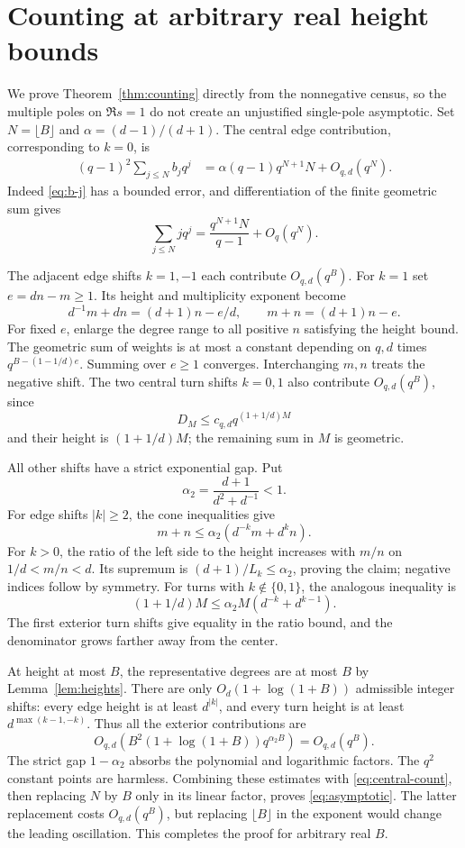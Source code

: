 \section{Counting at arbitrary real height bounds}\label{sec:counting}
We prove Theorem~\ref{thm:counting} directly from the nonnegative
census, so the multiple poles on $\Re s=1$ do not create an
unjustified single-pole asymptotic. Set
$N=\lfloor B\rfloor$ and $\alpha=(d-1)/(d+1)$.
The central edge contribution, corresponding to $k=0$, is
\begin{align}\label{eq:central-count}
 (q-1)^2\sum_{j\le N}b_jq^j
 &=\alpha(q-1)q^{N+1}N+O_{q,d}(q^N).
\end{align}
Indeed \eqref{eq:b-j} has a bounded error, and differentiation
of the finite geometric sum gives
\[
 \sum_{j\le N}j q^j=
 \frac{q^{N+1}N}{q-1}+O_q(q^N).
\]

The adjacent edge shifts $k=1,-1$ each contribute
$O_{q,d}(q^B)$. For $k=1$ set $e=dn-m\ge1$.
Its height and multiplicity exponent become
\[
 d^{-1}m+dn=(d+1)n-e/d,\qquad m+n=(d+1)n-e.
\]
For fixed $e$, enlarge the degree range to all positive $n$
satisfying the height bound. The geometric sum of weights is
at most a constant depending on $q,d$ times
$q^{B-(1-1/d)e}$. Summing over $e\ge1$ converges.
Interchanging $m,n$ treats the negative shift. The two central
turn shifts $k=0,1$ also contribute $O_{q,d}(q^B)$, since
\[
 D_M\le c_{q,d}q^{(1+1/d)M}
\]
and their height is $(1+1/d)M$; the remaining sum in $M$
is geometric.

All other shifts have a strict exponential gap. Put
\begin{equation}\label{eq:alpha-two}
 \alpha_2=\frac{d+1}{d^2+d^{-1}}<1.
\end{equation}
For edge shifts $|k|\ge2$, the cone inequalities give
\begin{equation}\label{eq:edge-gap}
 m+n\le\alpha_2(d^{-k}m+d^kn).
\end{equation}
For $k>0$, the ratio of the left side to the height increases
with $m/n$ on $1/d<m/n<d$. Its supremum is
$(d+1)/L_k\le\alpha_2$, proving the claim; negative
indices follow by symmetry. For turns with $k\notin\{0,1\}$,
the analogous inequality is
\begin{equation}\label{eq:turn-gap}
 (1+1/d)M\le\alpha_2 M(d^{-k}+d^{k-1}).
\end{equation}
The first exterior turn shifts give equality in the ratio
bound, and the denominator grows farther away from the center.

At height at most $B$, the representative degrees are at most
$B$ by Lemma~\ref{lem:heights}. There are only
$O_d(1+\log(1+B))$ admissible integer shifts: every edge
height is at least $d^{|k|}$, and every turn height is at least
$d^{\max(k-1,-k)}$. Thus all the exterior contributions are
\[
 O_{q,d}\!\left(B^2(1+\log(1+B))q^{\alpha_2B}\right)
 =O_{q,d}(q^B).
\]
The strict gap $1-\alpha_2$ absorbs the polynomial and
logarithmic factors. The $q^2$ constant points are harmless.
Combining these estimates with \eqref{eq:central-count},
then replacing $N$ by $B$ only in its linear factor, proves
\eqref{eq:asymptotic}. The latter replacement costs
$O_{q,d}(q^B)$, but replacing $\lfloor B\rfloor$ in the
exponent would change the leading oscillation. This completes
the proof for arbitrary real $B$.
